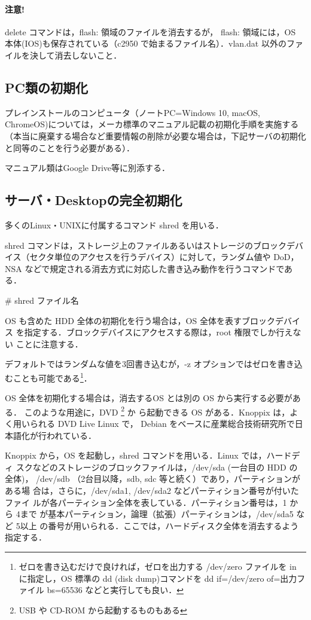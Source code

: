 \paragraph{注意!} 
delete コマンドは，flash: 領域のファイルを消去するが，
flash: 領域には，OS 本体(IOS)も保存されている（c2950 で始まるファイル名）．vlan.dat 以外のファイルを決して消去しないこと．

\subsection*{PC類の初期化}

プレインストールのコンピュータ（ノートPC=Windows 10, macOS, ChromeOS)については，メーカ標準のマニュアル記載の初期化手順を実施する（本当に廃棄する場合など重要情報の削除が必要な場合は，下記サーバの初期化と同等のことを行う必要がある）．

マニュアル類はGoogle Drive等に別添する．

\subsection*{サーバ・Desktopの完全初期化}

多くのLinux・UNIXに付属するコマンド shred を用いる．

shred コマンドは，ストレージ上のファイルあるいはストレージのブロックデバ
イス（セクタ単位のアクセスを行うデバイス）に対して，ランダム値や DoD，
NSA などで規定される消去方式に対応した書き込み動作を行うコマンドである．

\begin{cli}
# shred ファイル名
\end{cli}

OS も含めた HDD 全体の初期化を行う場合は，OS 全体を表すブロックデバイス
を指定する．ブロックデバイスにアクセスする際は，root 権限でしか行えない
ことに注意する．

デフォルトではランダムな値を3回書き込むが，-z オプションではゼロを書き込
むことも可能である\footnote{ゼロを書き込むだけで良ければ，ゼロを出力する
/dev/zero ファイルを in に指定し，OS 標準の dd (disk dump)コマンドを dd
if=/dev/zero of=出力ファイル bs=65536 などと実行しても良い．}．

OS 全体を初期化する場合は，消去するOS とは別の OS から実行する必要がある．
このような用途に，DVD \footnote{USB や CD-ROM から起動するものもある} か
ら起動できる OS がある．Knoppix は，よく用いられる DVD Live Linux で，
Debian をベースに産業総合技術研究所で日本語化が行われている．

Knoppix から，OS を起動し，shred コマンドを用いる．Linux では，ハードディ
スクなどのストレージのブロックファイルは，/dev/sda (一台目の HDD の 全体)，
/dev/sdb （2台目以降，sdb, sdc 等と続く）であり，パーティションがある場
合は，さらに，/dev/sda1, /dev/sda2 などパーティション番号が付いたファイ
ルが各パーティション全体を表している．パーティション番号は，1 から 4まで
が基本パーティション，論理（拡張）パーティションは，/dev/sda5 など 5以上
の番号が用いられる．ここでは，ハードディスク全体を消去するよう指定する．

